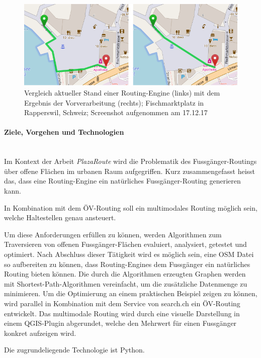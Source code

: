 \begin{figure}[ht]
    \centering
    \includegraphics[width=1\linewidth]{technicalreport/img/compare_fischmarktplatz.png}
    \caption[Vergleich Ausgangslage und Ergebnis]{Vergleich aktueller Stand einer Routing-Engine (links) mit dem Ergebnis der Vorverarbeitung (rechts); Fischmarktplatz in Rapperswil, Schweiz; Screenshot aufgenommen am 17.12.17}
    \label{fig:compare_fischmarktplatz}
\end{figure}


\paragraph{Ziele, Vorgehen und Technologien}~\\
Im Kontext der Arbeit \emph{PlazaRoute} wird die Problematik des Fussgänger-Routings über offene Flächen im urbanen Raum aufgegriffen. Kurz zusammengefasst heisst das, dass eine Routing-Engine ein natürliches Fussgänger-Routing generieren kann.

In Kombination mit dem ÖV-Routing soll ein multimodales Routing möglich sein, welche Haltestellen genau ansteuert.

Um diese Anforderungen erfüllen zu können, werden Algorithmen zum Traversieren von offenen Fussgänger-Flächen evaluiert, analysiert, getestet und optimiert. Nach Abschluss dieser Tätigkeit wird es möglich sein, eine \ac{OSM} Datei so aufbereiten zu können, dass Routing-Engines dem Fussgänger ein natürliches Routing bieten können. Die durch die Algorithmen erzeugten Graphen werden mit Shortest-Path-Algorithmen vereinfacht, um die zusätzliche Datenmenge zu minimieren.
Um die Optimierung an einem praktischen Beispiel zeigen zu können, wird parallel in Kombination mit dem Service von search.ch ein ÖV-Routing entwickelt. Das multimodale Routing wird durch eine visuelle Darstellung in einem QGIS-Plugin abgerundet, welche den Mehrwert für einen Fussgänger konkret aufzeigen wird.

Die zugrundeliegende Technologie ist Python.

